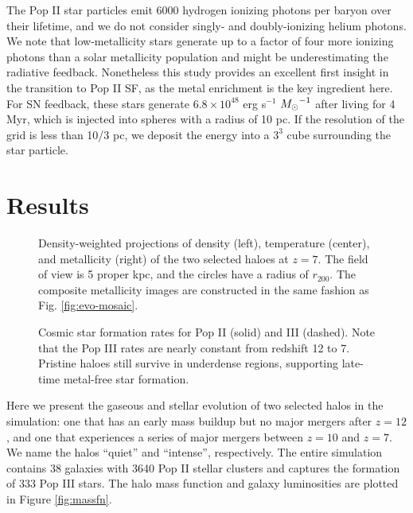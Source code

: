 \documentclass[apjl]{emulateapj}
\begin{document}
The Pop II star particles emit 6000 hydrogen ionizing photons per
baryon over their lifetime, and we do not consider singly- and
doubly-ionizing helium photons.  We note that low-metallicity stars
generate up to a factor of four more ionizing photons than a solar
metallicity population \citep{Schaerer03} and might be underestimating
the radiative feedback.  Nonetheless this study provides an excellent
first insight in the transition to Pop II SF, as the metal enrichment
is the key ingredient here.  For SN feedback, these stars generate
$6.8 \times 10^{48}$ erg s$^{-1}$ $\Ms^{-1}$ after living for 4 Myr,
which is injected into spheres with a radius of 10 pc.  If the
resolution of the grid is less than 10/3 pc, we deposit the energy
into a $3^3$ cube surrounding the star particle.

\section{Results}
\label{sec:results}


\begin{figure}
  \caption{\label{fig:halo-mosaic} Density-weighted projections of
    density (left), temperature (center), and metallicity (right) of
    the two selected haloes at $z=7$.  The field of view is 5 proper
    kpc, and the circles have a radius of $r_{200}$.  The composite
    metallicity images are constructed in the same fashion as
    Fig. \ref{fig:evo-mosaic}.}
\end{figure}



\begin{figure}
\caption{\label{fig:sfr} Cosmic star formation rates for Pop II
  (solid) and III (dashed).  Note that the Pop III rates are nearly
  constant from redshift 12 to 7.  Pristine haloes still survive in
  underdense regions, supporting late-time metal-free star formation.}
\end{figure}


Here we present the gaseous and stellar evolution of two selected
halos in the simulation: one that has an early mass buildup but no
major mergers after $z=12$, and one that experiences a series of major
mergers between $z=10$ and $z=7$.  We name the halos ``quiet'' and
``intense'', respectively.  The entire simulation contains 38 galaxies
with 3640 Pop II stellar clusters and captures the formation of 333
Pop III stars.  The halo mass function and galaxy luminosities are
plotted in Figure \ref{fig:massfn}.
\end{document}
